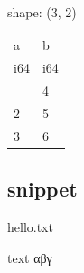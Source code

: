 \documentclass[
  a4paper,
  jafontscale=0.92,
  hanging_punctuation,
  head_space=24.8mm,
  foot_space=24.8mm]{jlreq}
\newenvironment{Shaded}{}{}
\newcommand{\NormalTok}[1]{#1}
\begin{document}
{shape: (3, 2)}

\begin{longtable}[]{@{}ll@{}}
\toprule\noalign{}
a & b \\
i64 & i64 \\
\midrule\noalign{}
\endhead
\bottomrule\noalign{}
\endlastfoot
1 & 4 \\
2 & 5 \\
3 & 6 \\
\end{longtable}

\subsection{snippet}\label{snippet}


\begin{Shaded}
\begin{Highlighting}[]
\NormalTok{hello.txt}
\end{Highlighting}
\end{Shaded}

\vspace{-0.5\baselineskip}


\begin{Shaded}
\begin{Highlighting}[]
\NormalTok{text αβγ}
\end{Highlighting}
\end{Shaded}
\end{document}
